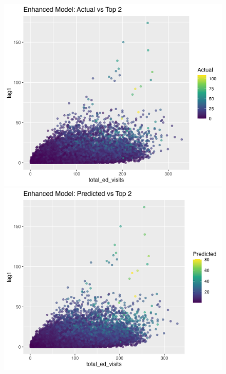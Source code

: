 \documentclass[11pt]{article}
\begin{document}
\begin{figure}[H]
  \centering
  \begin{minipage}[b]{0.32\textwidth}
    \centering
    \includegraphics[width=\textwidth]{plot_actual_vs_top2_enhanced.png}
  \end{minipage}\hfill
  \begin{minipage}[b]{0.32\textwidth}
    \centering
    \includegraphics[width=\textwidth]{plot_predicted_vs_top2_enhanced.png}

\end{minipage}
\end{figure}
\end{document}
